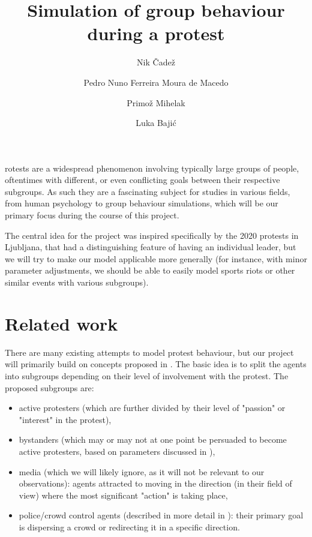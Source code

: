 \documentclass[9pt]{pnas-new}
\title{Simulation of group behaviour during a protest}
\author{Nik Čadež}
\author{Pedro Nuno Ferreira Moura de Macedo}
\author{Primož Mihelak}
\author{Luka Bajić}
\affil{Collective behaviour course research seminar report}
\begin{document}
\verticaladjustment{-2pt}

\maketitle
\thispagestyle{firststyle}

rotests are a widespread phenomenon involving typically large groups of people, oftentimes with different, or even conflicting goals between their respective subgroups. As such they are a fascinating subject for studies in various fields, from human psychology to group behaviour simulations, which will be our primary focus during the course of this project. 

\bigskip
The central idea for the project was inspired specifically by the 2020 protests in Ljubljana, that had a distinguishing feature of having an individual leader, but we will try to make our model applicable more generally (for instance, with minor parameter adjustments, we should be able to easily model sports riots or other similar events with various subgroups).  



\section*{Related work}

There are many existing attempts to model protest behaviour, but our project will primarily build on concepts proposed in \cite{protests}. The basic idea is to split the agents into subgroups depending on their level of involvement with the protest. The proposed subgroups are:
\begin{itemize}
    \item active protesters (which are further divided by their level of "passion" or "interest" in the protest), 
    \item bystanders (which may or may not at one point be persuaded to become active protesters, based on parameters discussed in \cite{sportsriots}),
    \item media (which we will likely ignore, as it will not be relevant to our observations): agents attracted to moving in the direction (in their field of view) where the most significant "action" is taking place,
    \item police/crowd control agents (described in more detail in \cite{crowdcontrol2}): their primary goal is dispersing a crowd or redirecting it in a specific direction.
\end{itemize}
\end{document}
